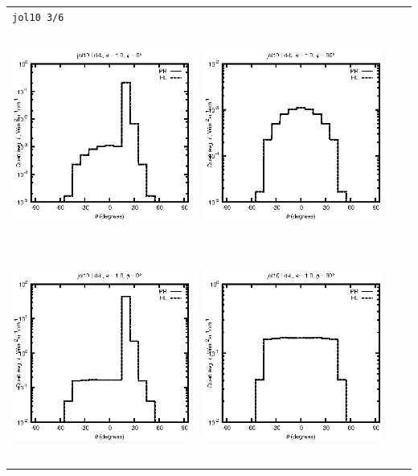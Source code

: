 \begin{tabular}{c c c c}
\multicolumn{4}{l}{\texttt{jol10 3/6}} \\
\includegraphics[height=7cm]{../eps/jol10_Ld_b_fwd.eps} &
\includegraphics[height=7cm]{../eps/jol10_Ld_b_cross.eps} \\
\includegraphics[height=7cm]{../eps/jol10_Ld_it_fwd.eps} &
\includegraphics[height=7cm]{../eps/jol10_Ld_it_cross.eps} \\

\end{tabular}

